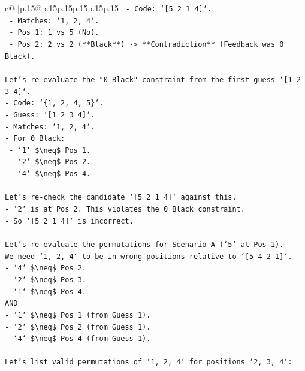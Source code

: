 \documentclass{article}
\begin{document}
{\begin{supertabular}{c@{$\;$}|p{.15\linewidth}@{}p{.15\linewidth}p{.15\linewidth}p{.15\linewidth}p{.15\linewidth}p{.15\linewidth}}
{{{\texttt{    {-} Code: `{[}5 2 1 4{]}`.} \\
\texttt{    {-} Matches: `1, 2, 4`.} \\
\texttt{    {-} Pos 1: 1 vs 5 (No).} \\
\texttt{    {-} Pos 2: 2 vs 2 (**Black**) {-}> **Contradiction** (Feedback was 0 Black).} \\
\\ 
\texttt{Let's re{-}evaluate the "0 Black" constraint from the first guess `{[}1 2 3 4{]}`.} \\
\texttt{{-} Code: `\{1, 2, 4, 5\}`.} \\
\texttt{{-} Guess: `{[}1 2 3 4{]}`.} \\
\texttt{{-} Matches: `1, 2, 4`.} \\
\texttt{{-} For 0 Black:} \\
\texttt{    {-} `1` \$\textbackslash{}neq\$ Pos 1.} \\
\texttt{    {-} `2` \$\textbackslash{}neq\$ Pos 2.} \\
\texttt{    {-} `4` \$\textbackslash{}neq\$ Pos 4.} \\
\\ 
\texttt{Let's re{-}check the candidate `{[}5 2 1 4{]}` against this.} \\
\texttt{{-} `2` is at Pos 2. This violates the 0 Black constraint.} \\
\texttt{{-} So `{[}5 2 1 4{]}` is incorrect.} \\
\\ 
\texttt{Let's re{-}evaluate the permutations for Scenario A (`5` at Pos 1).} \\
\texttt{We need `1, 2, 4` to be in wrong positions relative to `{[}5 4 2 1{]}`.} \\
\texttt{{-} `4` \$\textbackslash{}neq\$ Pos 2.} \\
\texttt{{-} `2` \$\textbackslash{}neq\$ Pos 3.} \\
\texttt{{-} `1` \$\textbackslash{}neq\$ Pos 4.} \\
\texttt{AND} \\
\texttt{{-} `1` \$\textbackslash{}neq\$ Pos 1 (from Guess 1).} \\
\texttt{{-} `2` \$\textbackslash{}neq\$ Pos 2 (from Guess 1).} \\
\texttt{{-} `4` \$\textbackslash{}neq\$ Pos 4 (from Guess 1).} \\
\\ 
\texttt{Let's list valid permutations of `1, 2, 4` for positions `2, 3, 4`:} \\
}}}
\end{supertabular}}
\end{document}
